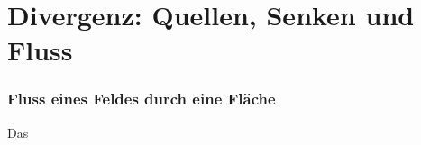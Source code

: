 \chapter{Divergenz: Quellen, Senken und Fluss}



\subsection{Fluss eines Feldes durch eine Fläche}

Das 